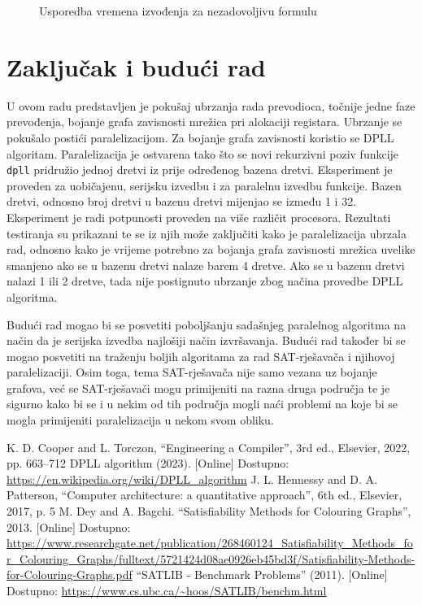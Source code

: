 \documentclass[hidelinks, conference]{IEEEtran}
\begin{document}
\begin{figure}[ht]
\centerline{}
\caption{Usporedba vremena izvođenja za nezadovoljivu formulu}
\label{fig5}
\end{figure}

\section{Zaključak i budući rad}

U ovom radu predstavljen je pokušaj ubrzanja rada prevodioca, točnije jedne faze prevođenja, bojanje grafa zavisnosti mrežica pri alokaciji registara. Ubrzanje se pokušalo postići paralelizacijom. Za bojanje grafa zavisnosti koristio se DPLL algoritam. Paralelizacija je ostvarena tako što se novi rekurzivni poziv funkcije \texttt{dpll} pridružio jednoj dretvi iz prije određenog bazena dretvi. Eksperiment je proveden za uobičajenu, serijsku izvedbu i za paralelnu izvedbu funkcije. Bazen dretvi, odnosno broj dretvi u bazenu dretvi mijenjao se između 1 i 32. Eksperiment je radi potpunosti proveden na više različit procesora. Rezultati testiranja su prikazani te se iz njih može zaključiti kako je paralelizacija ubrzala rad, odnosno kako je vrijeme potrebno za bojanja grafa zavisnosti mrežica uvelike smanjeno ako se u bazenu dretvi nalaze barem 4 dretve. Ako se u bazenu dretvi nalazi 1 ili 2 dretve, tada nije postignuto ubrzanje zbog načina provedbe DPLL algoritma.

Budući rad mogao bi se posvetiti poboljšanju sadašnjeg paralelnog algoritma na način da je serijska izvedba najlošiji način izvršavanja. Budući rad također bi se mogao posvetiti na traženju boljih algoritama za rad SAT-rješavača i njihovoj paralelizaciji. Osim toga, tema SAT-rješavača nije samo vezana uz bojanje grafova, već se SAT-rješavači mogu primijeniti na razna druga područja te je sigurno kako bi se i u nekim od tih područja mogli naći problemi na koje bi se mogla primijeniti paralelizacija u nekom svom obliku.

\begin{thebibliography}{00}
 K. D. Cooper and L. Torczon, ``Engineering a Compiler'', 3rd ed., Elsevier, 2022, pp. 663--712
 DPLL algorithm (2023). [Online] Dostupno: \url{https://en.wikipedia.org/wiki/DPLL_algorithm}
 J. L. Hennessy and D. A. Patterson, ``Computer architecture: a quantitative approach'', 6th ed., Elsevier, 2017, p. 5
 M. Dey and A. Bagchi. ``Satisfiability Methods for Colouring Graphs'', 2013. [Online] Dostupno:
\url{https://www.researchgate.net/publication/268460124_Satisfiability_Methods_for_Colouring_Graphs/fulltext/5721424d08ae0926eb45bd3f/Satisfiability-Methods-for-Colouring-Graphs.pdf}
 ``SATLIB - Benchmark Problems'' (2011). [Online] Dostupno:
\url{https://www.cs.ubc.ca/~hoos/SATLIB/benchm.html}
\end{thebibliography}
\vspace{12pt}
\end{document}
